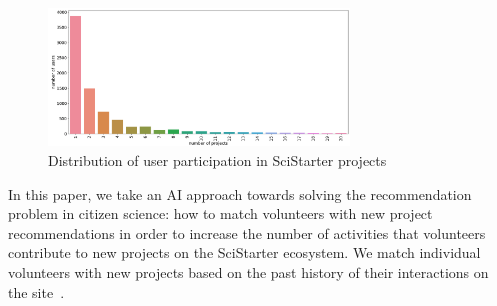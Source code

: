 \documentclass[letterpaper]{article} %
\begin{document}
 
  

\begin{figure}[t]
\centering
\includegraphics[width=8cm]{Figs/participation histogram.png}
\caption{Distribution of user participation in SciStarter projects
}
\label{fig:pinp}
\end{figure}

  



 
  
 In this paper, we take an AI approach towards solving the 
 recommendation problem in citizen science: how to match volunteers 
 with new project recommendations in order to increase the  
 number of activities that volunteers contribute to new projects on 
 the SciStarter ecosystem.  
  We match individual volunteers with new projects based on the  past history of their interactions on the site~\cite{dwivedi2017recommender,amatriain2013big}.
  
\end{document}
